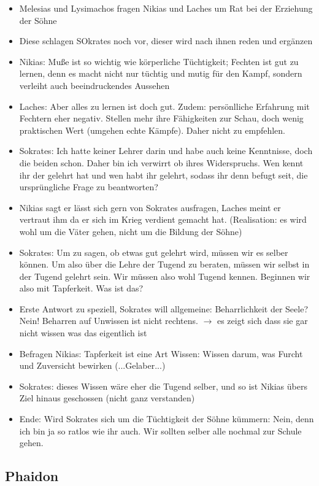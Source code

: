 \documentclass[emulatestandardclasses]{scrartcl}
\begin{document}
\begin{itemize}
  \item Melesias und Lysimachos fragen Nikias und Laches um Rat bei der Erziehung der Söhne
  \item Diese schlagen SOkrates noch vor, dieser wird nach ihnen reden und ergänzen
  \item Nikias: Muße ist so wichtig wie körperliche Tüchtigkeit; Fechten ist gut zu lernen, denn es macht nicht nur tüchtig und mutig für den Kampf, sondern verleiht auch beeindruckendes Aussehen
  \item Laches: Aber alles zu lernen ist doch gut. Zudem: persönlliche Erfahrung mit Fechtern eher negativ. Stellen mehr ihre Fähigkeiten zur Schau, doch wenig praktischen Wert (umgehen echte Kämpfe). Daher nicht zu empfehlen.
  \item Sokrates: Ich hatte keiner Lehrer darin und habe auch keine Kenntnisse, doch die beiden schon. Daher bin ich verwirrt ob ihres Widerspruchs. Wen kennt ihr der gelehrt hat und wen habt ihr gelehrt, sodass ihr denn befugt seit, die ursprüngliche Frage zu beantworten? 
  \item Nikias sagt er lässt sich gern von Sokrates ausfragen, Laches meint er vertraut ihm da er sich im Krieg verdient gemacht hat. (Realisation: es wird wohl um die Väter gehen, nicht um die Bildung der Söhne)
  \item Sokrates: Um zu sagen, ob etwas gut gelehrt wird, müssen wir es selber können. Um also über die Lehre der Tugend zu beraten, müssen wir selbst in der Tugend gelehrt sein. Wir müssen also wohl Tugend kennen. Beginnen wir also mit Tapferkeit. Was ist das?  
  \item Erste Antwort zu speziell, Sokrates will allgemeine: Beharrlichkeit der Seele? Nein! Beharren auf Unwissen ist nicht rechtens. $\rightarrow$ es zeigt sich dass sie gar nicht wissen was das eigentlich ist
  \item Befragen Nikias: Tapferkeit ist eine Art Wissen: Wissen darum, was Furcht und Zuversicht bewirken (...Gelaber...)
  \item Sokrates: dieses Wissen wäre eher die Tugend selber, und so ist Nikias übers Ziel hinaus geschossen (nicht ganz verstanden)
  \item Ende: Wird Sokrates sich um die Tüchtigkeit der Söhne kümmern: Nein, denn ich bin ja so ratlos wie ihr auch. Wir sollten selber alle nochmal zur Schule gehen.
\end{itemize}


\subsection{Phaidon}
\end{document}
